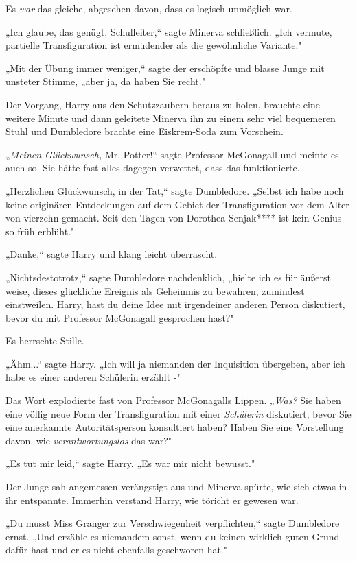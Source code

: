 {Es \emph{war} das gleiche, abgesehen davon, dass es logisch unmöglich war.

„Ich glaube, das genügt, Schulleiter,“ sagte Minerva schließlich. „Ich vermute, partielle Transfiguration ist ermüdender als die gewöhnliche Variante."

„Mit der Übung immer weniger,“ sagte der erschöpfte und blasse Junge mit unsteter Stimme, „aber ja, da haben Sie recht."

Der Vorgang, Harry aus den Schutzzaubern heraus zu holen, brauchte eine weitere Minute und dann geleitete Minerva ihn zu einem sehr viel bequemeren Stuhl und Dumbledore brachte eine Eiskrem-Soda zum Vorschein.

„\emph{Meinen Glückwunsch,} Mr. Potter!“ sagte Professor McGonagall und meinte es auch so. Sie hätte fast alles dagegen verwettet, dass das funktionierte.

„Herzlichen Glückwunsch, in der Tat,“ sagte Dumbledore. „Selbst ich habe noch keine originären Entdeckungen auf dem Gebiet der Transfiguration vor dem Alter von vierzehn gemacht. Seit den Tagen von Dorothea Senjak**** ist kein Genius so früh erblüht."

„Danke,“ sagte Harry und klang leicht überrascht.

„Nichtsdestotrotz,“ sagte Dumbledore nachdenklich, „hielte ich es für äußerst weise, dieses glückliche Ereignis als Geheimnis zu bewahren, zumindest einstweilen. Harry, hast du deine Idee mit irgendeiner anderen Person diskutiert, bevor du mit Professor McGonagall gesprochen hast?"

Es herrschte Stille.

„Ähm...“ sagte Harry. „Ich will ja niemanden der Inquisition übergeben, aber ich habe es einer anderen Schülerin erzählt -"

Das Wort explodierte fast von Professor McGonagalls Lippen. „\emph{Was?} Sie haben eine völlig neue Form der Transfiguration mit einer \emph{Schülerin} diskutiert, bevor Sie eine anerkannte Autoritätsperson konsultiert haben? Haben Sie eine Vorstellung davon, wie \emph{verantwortungslos} das war?"

„Es tut mir leid,“ sagte Harry. „Es war mir nicht bewusst."

Der Junge sah angemessen verängstigt aus und Minerva spürte, wie sich etwas in ihr entspannte. Immerhin verstand Harry, wie töricht er gewesen war.

„Du musst Miss Granger zur Verschwiegenheit verpflichten,“ sagte Dumbledore ernst. „Und erzähle es niemandem sonst, wenn du keinen wirklich guten Grund dafür hast und er es nicht ebenfalls geschworen hat."

}
